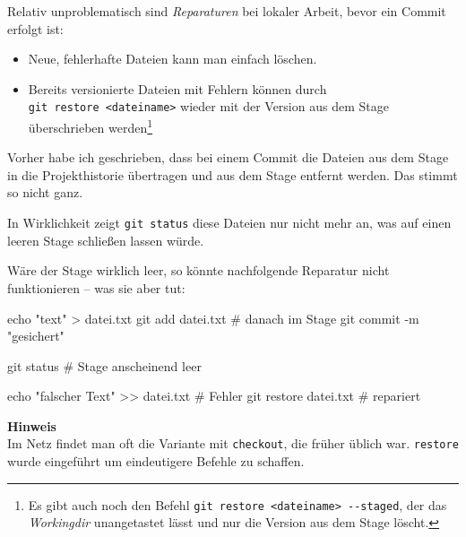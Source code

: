 \documentclass[
  letterpaper,
  DIV=11]{scrreprt}
\newenvironment{Shaded}{\begin{snugshade}}{\end{snugshade}}
\newcommand{\AttributeTok}[1]{\textcolor[rgb]{0.40,0.45,0.13}{#1}}
\newcommand{\BuiltInTok}[1]{\textcolor[rgb]{0.00,0.23,0.31}{#1}}
\newcommand{\CommentTok}[1]{\textcolor[rgb]{0.37,0.37,0.37}{#1}}
\newcommand{\FunctionTok}[1]{\textcolor[rgb]{0.28,0.35,0.67}{#1}}
\newcommand{\NormalTok}[1]{\textcolor[rgb]{0.00,0.23,0.31}{#1}}
\newcommand{\OperatorTok}[1]{\textcolor[rgb]{0.37,0.37,0.37}{#1}}
\newcommand{\StringTok}[1]{\textcolor[rgb]{0.13,0.47,0.30}{#1}}
\providecommand{\tightlist}{%
  \setlength{\itemsep}{0pt}\setlength{\parskip}{0pt}}\usepackage{longtable,booktabs,array}
\newcommand{\work}{\textit{Workingdir}\xspace}
\begin{document}
Relativ unproblematisch sind \emph{Reparaturen} bei lokaler Arbeit,
bevor ein Commit erfolgt ist:

\begin{itemize}
\tightlist
\item
  Neue, fehlerhafte Dateien kann man einfach löschen.
\item
  Bereits versionierte Dateien mit Fehlern können durch
  \texttt{git\ restore\ \textless{}dateiname\textgreater{}} wieder mit
  der Version aus dem Stage überschrieben werden\footnote{Es gibt auch
    noch den Befehl
    \texttt{git\ restore\ \textless{}dateiname\textgreater{}\ -\/-staged},
    der das \work unangetastet lässt und nur die Version aus dem Stage
    löscht.}
\end{itemize}

\samplestart

Vorher habe ich geschrieben, dass bei einem Commit die Dateien aus dem
Stage in die Projekthistorie übertragen und aus dem Stage entfernt
werden. Das stimmt so nicht ganz.

In Wirklichkeit zeigt \texttt{git\ status} diese Dateien nur nicht mehr
an, was auf einen leeren Stage schließen lassen würde. \sampleend

Wäre der Stage wirklich leer, so könnte nachfolgende Reparatur nicht
funktionieren -- was sie aber tut:

\begin{Shaded}
\begin{Highlighting}[]
\BuiltInTok{echo} \StringTok{"text"} \OperatorTok{\textgreater{}}\NormalTok{ datei.txt }
\FunctionTok{git}\NormalTok{ add datei.txt     }\CommentTok{\# danach im Stage }
\FunctionTok{git}\NormalTok{ commit }\AttributeTok{{-}m} \StringTok{"gesichert"}

\FunctionTok{git}\NormalTok{ status   }\CommentTok{\# Stage anscheinend leer }

\BuiltInTok{echo} \StringTok{"falscher Text"} \OperatorTok{\textgreater{}\textgreater{}}\NormalTok{ datei.txt   }\CommentTok{\#  Fehler }
\FunctionTok{git}\NormalTok{ restore datei.txt              }\CommentTok{\# repariert}
\end{Highlighting}
\end{Shaded}

\samplestart

\textbf{Hinweis}\\
Im Netz findet man oft die Variante mit \texttt{checkout}, die früher
üblich war. \texttt{restore} wurde eingeführt um eindeutigere Befehle zu
schaffen. \sampleend
\end{document}

